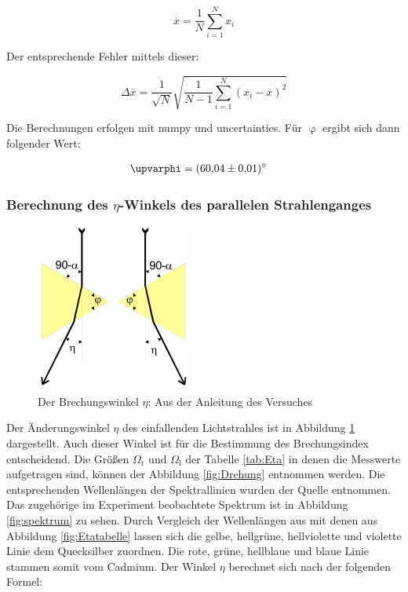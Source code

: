 \begin{equation}
  \label{eqn:mittelwert}
  \overline{x} = \frac{1}{N} \sum_{i=1}^N x_i
\end{equation}

Der entsprechende Fehler mittels dieser:

\begin{equation}
  \label{eqn:mittelwertfehler}
  \Delta \overline{x} = \frac{1}{\sqrt{N}} \sqrt{\frac{1}{N-1} \sum_{i=1}^N (x_i - \overline{x})^2}
\end{equation}

Die Berechnungen erfolgen mit numpy und uncertainties.
Für $\upvarphi$ ergibt sich dann folgender Wert:

\begin{align*}
  \upvarphi &= \SI{60.04 \pm 0.01}{\degree}
\end{align*}

\subsubsection{Berechnung des \texorpdfstring{$\eta$}{eta}-Winkels des parallelen Strahlenganges}

\begin{figure}
  \centering
  \includegraphics[scale=0.6]{images/Eta2.png}
  \caption{Der Brechungswinkel $\eta$: Aus der Anleitung des Versuches \cite[25]{1}}
  \label{fig:Eta2}
\end{figure}

Der Änderungswinkel $\eta$ des einfallenden Lichtstrahles ist in Abbildung \ref{fig:Eta2} dargestellt.
Auch dieser Winkel ist für die Bestimmung des Brechungsindex entscheidend.
Die Größen $\Omega_{\text{r}}$ und $\Omega_{\text{l}}$ der Tabelle \ref{tab:Eta} in denen die Messwerte aufgetragen sind, können der Abbildung \ref{fig:Drehung} entnommen werden.
Die entsprechenden Wellenlängen der Spektrallinien wurden der Quelle \cite{2} entnommen.
Das zugehörige im Experiment beobachtete Spektrum ist in Abbildung \ref{fig:spektrum} zu sehen.
Durch Vergleich der Wellenlängen aus \cite{2} mit denen aus Abbildung \ref{fig:Etatabelle} lassen sich
die gelbe, hellgrüne, hellviolette und violette Linie dem Quecksilber zuordnen.
Die rote, grüne, hellblaue  und blaue Linie stammen somit vom Cadmium.
Der Winkel $\eta$ berechnet sich nach der folgenden Formel:

